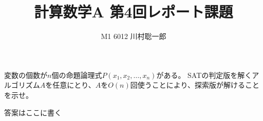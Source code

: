 \documentclass[dvipdfmx]{jsreport}
\title{計算数学A 第4回レポート課題}
\author{M1 6012 川村聡一郎}
\date{}
\begin{document}
\maketitle
\begin{tcolorbox}
	変数の個数が$n$個の命題論理式$P(x_1, x_2, \ldots, x_n)$がある。
	SATの判定版を解くアルゴリズム$A$を任意にとり、$A$を$O(n)$回使うことにより、探索版が解けることを示せ。
\end{tcolorbox}

\begin{souanswer} %
	答案はここに書く
\end{souanswer}
\end{document}
